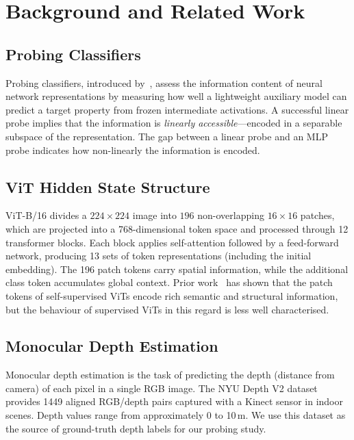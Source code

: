 \documentclass[11pt,a4paper]{article}
\begin{document}
\section{Background and Related Work}

\subsection{Probing Classifiers}

Probing classifiers, introduced by~\cite{alain2017understanding}, assess the
information content of neural network representations by measuring how well a
lightweight auxiliary model can predict a target property from frozen
intermediate activations.  A successful linear probe implies that the
information is \emph{linearly accessible}---encoded in a separable subspace of
the representation.  The gap between a linear probe and an MLP probe indicates
how non-linearly the information is encoded.

\subsection{ViT Hidden State Structure}

ViT-B/16 divides a $224\times224$ image into $196$ non-overlapping
$16\times16$ patches, which are projected into a 768-dimensional token space
and processed through 12 transformer blocks.  Each block applies self-attention
followed by a feed-forward network, producing 13 sets of token
representations (including the initial embedding).  The 196 patch tokens carry
spatial information, while the additional class token accumulates global
context.  Prior work~\cite{caron2021dino,oquab2023dinov2} has shown that the
patch tokens of self-supervised ViTs encode rich semantic and structural
information, but the behaviour of supervised ViTs in this regard is less well
characterised.

\subsection{Monocular Depth Estimation}

Monocular depth estimation is the task of predicting the depth (distance from
camera) of each pixel in a single RGB image.  The NYU Depth V2
dataset~\cite{silberman2012nyudepth} provides 1449 aligned RGB/depth pairs
captured with a Kinect sensor in indoor scenes.  Depth values range from
approximately 0 to 10\,m.  We use this dataset as the source of ground-truth
depth labels for our probing study.
\end{document}
